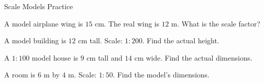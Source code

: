 
\newpage
\begin{stepPractice}{Scale Models Practice}
    \resetProblems

    \prob A model airplane wing is $15$ cm. The real wing is $12$ m. What is the scale factor? \answerBlank[2.5cm]

    \prob A model building is $12$ cm tall. Scale: $1 : 200$. Find the actual height. \answerBlank[2.5cm]

    \prob A $1 : 100$ model house is $9$ cm tall and $14$ cm wide. Find the actual dimensions. \answerBlank[3cm]

    \prob A room is $6$ m by $4$ m. Scale: $1 : 50$. Find the model's dimensions. \answerBlank[3cm]

\end{stepPractice}
